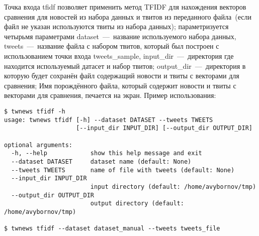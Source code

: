 
        Точка входа tfidf позволяет применить метод TFIDF для нахождения векторов сравнения для новостей из набора данных и твитов из
        переданного файла~(если файл не указан используются твиты из набора данных);
        параметризуется четырьмя параметрами
        dataset~---~название используемого набора данных,
        tweets~---~название файла с набором твитов, который был построен с использованием точки входа tweets\_sample,
        input\_dir~---~директория где находится используемый датасет и набор твитов;
        output\_dir~---~директория в которую будет сохранён файл содержащий новости и твиты с векторами для сравнения;
        Имя порождённого файла, который содержит новости и твиты с векторами для сравнения, печается на экран. Пример использования:
        \begin{lstlisting}
$ twnews tfidf -h
usage: twnews tfidf [-h] --dataset DATASET --tweets TWEETS
                    [--input_dir INPUT_DIR] [--output_dir OUTPUT_DIR]

optional arguments:
  -h, --help            show this help message and exit
  --dataset DATASET     dataset name (default: None)
  --tweets TWEETS       name of file with tweets (default: None)
  --input_dir INPUT_DIR
                        input directory (default: /home/avybornov/tmp)
  --output_dir OUTPUT_DIR
                        output directory (default: /home/avybornov/tmp)

$ twnews tfidf --dataset dataset_manual --tweets tweets_file
        \end{lstlisting}



